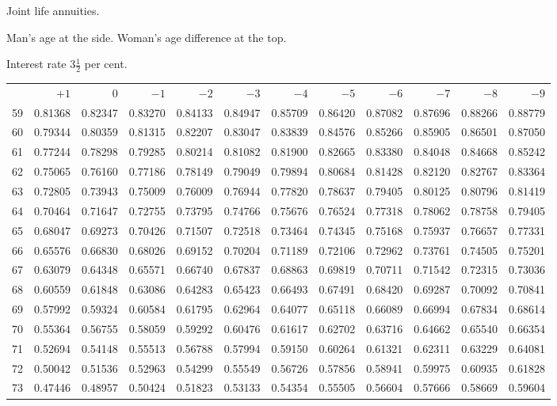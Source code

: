 \clearpage
{}
\begin{center}
Joint life annuities.\par\smallskip
Man's age at the side. Woman's age difference at the top.\par\smallskip
Interest rate \(3\tfrac{1}{2}\) per cent.\par\medskip
\fontsize{8}{10}\selectfont\setlength{\tabcolsep}{1.3pt}
\begin{tabular}{|r|rrrrrrrrrrr|}
\hline
&\(+1\)&0&\(-1\)&\(-2\)&\(-3\)&\(-4\)&\(-5\)&\(-6\)&\(-7\)&\(-8\)&\(-9\)\\[8pt]
59&0.81368&0.82347&0.83270&0.84133&0.84947&0.85709&0.86420&0.87082&0.87696&0.88266&0.88779\\
60&0.79344&0.80359&0.81315&0.82207&0.83047&0.83839&0.84576&0.85266&0.85905&0.86501&0.87050\\
61&0.77244&0.78298&0.79285&0.80214&0.81082&0.81900&0.82665&0.83380&0.84048&0.84668&0.85242\\
62&0.75065&0.76160&0.77186&0.78149&0.79049&0.79894&0.80684&0.81428&0.82120&0.82767&0.83364\\
63&0.72805&0.73943&0.75009&0.76009&0.76944&0.77820&0.78637&0.79405&0.80125&0.80796&0.81419\\
64&0.70464&0.71647&0.72755&0.73795&0.74766&0.75676&0.76524&0.77318&0.78062&0.78758&0.79405\\[5pt]
65&0.68047&0.69273&0.70426&0.71507&0.72518&0.73464&0.74345&0.75168&0.75937&0.76657&0.77331\\
66&0.65576&0.66830&0.68026&0.69152&0.70204&0.71189&0.72106&0.72962&0.73761&0.74505&0.75201\\
67&0.63079&0.64348&0.65571&0.66740&0.67837&0.68863&0.69819&0.70711&0.71542&0.72315&0.73036\\
68&0.60559&0.61848&0.63086&0.64283&0.65423&0.66493&0.67491&0.68420&0.69287&0.70092&0.70841\\
69&0.57992&0.59324&0.60584&0.61795&0.62964&0.64077&0.65118&0.66089&0.66994&0.67834&0.68614\\[5pt]
70&0.55364&0.56755&0.58059&0.59292&0.60476&0.61617&0.62702&0.63716&0.64662&0.65540&0.66354\\
71&0.52694&0.54148&0.55513&0.56788&0.57994&0.59150&0.60264&0.61321&0.62311&0.63229&0.64081\\
72&0.50042&0.51536&0.52963&0.54299&0.55549&0.56726&0.57856&0.58941&0.59975&0.60935&0.61828\\
73&0.47446&0.48957&0.50424&0.51823&0.53133&0.54354&0.55505&0.56604&0.57666&0.58669&0.59604\\

\end{tabular}
\end{center}
